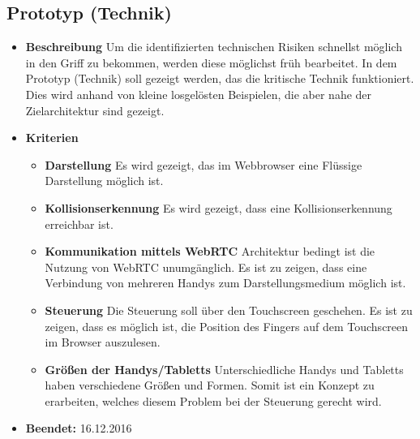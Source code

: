 \subsection{Prototyp (Technik)}
\begin{itemize}
	\item \textbf{Beschreibung}\newline
	Um die identifizierten technischen Risiken schnellst möglich in den Griff zu bekommen, werden diese möglichst früh bearbeitet. In dem Prototyp (Technik) soll gezeigt werden, das die kritische Technik funktioniert. Dies wird anhand von kleine losgelösten Beispielen, die aber nahe der Zielarchitektur sind gezeigt.
	\item \textbf{Kriterien}
	\begin{itemize}
		\item \textbf{Darstellung} \newline
		Es wird gezeigt, das im Webbrowser eine Flüssige Darstellung möglich ist.
		\item \textbf{Kollisionserkennung} \newline
		Es wird gezeigt, dass eine Kollisionserkennung erreichbar ist.
		\item \textbf{Kommunikation mittels WebRTC} \newline
		Architektur bedingt ist die Nutzung von WebRTC unumgänglich. Es ist zu zeigen, dass eine Verbindung von mehreren Handys zum Darstellungsmedium möglich ist.
		\item \textbf{Steuerung} \newline
		Die Steuerung soll über den Touchscreen geschehen. Es ist zu zeigen, dass es möglich ist, die Position des Fingers auf dem Touchscreen im Browser auszulesen.
		\item \textbf{Größen der Handys/Tabletts} \newline
		Unterschiedliche Handys und Tabletts haben verschiedene Größen und Formen. Somit ist ein Konzept zu erarbeiten, welches diesem Problem bei der Steuerung gerecht wird.
	\end{itemize}
	\item \textbf{Beendet:} 16.12.2016
\end{itemize}

